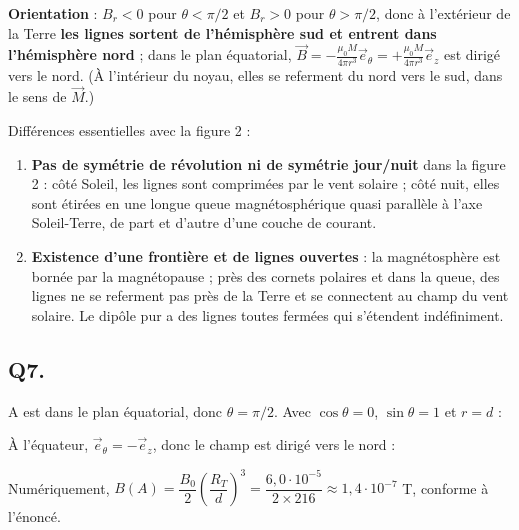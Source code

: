 \documentclass[11pt,a4paper]{article}
\providecommand{\tightlist}{\setlength{\itemsep}{0pt}\setlength{\parskip}{0pt}}
\newcommand{\equationajustee}[1]{%
  \sbox{\boiteequation}{$\displaystyle #1$}%
  \ifdim\wd\boiteequation>\linewidth
    \[\resizebox{\linewidth}{!}{\usebox{\boiteequation}}\]%
  \else
    \[#1\]%
  \fi}
\begin{document}
\textbf{Orientation} : \(B_r<0\) pour \(\theta<\pi/2\) et \(B_r>0\) pour \(\theta>\pi/2\), donc à l'extérieur de la Terre \textbf{les lignes sortent de l'hémisphère sud et entrent dans l'hémisphère nord} ; dans le plan équatorial, \(\vec B=-\frac{\mu_0M}{4\pi r^3}\vec e_\theta=+\frac{\mu_0M}{4\pi r^3}\vec e_z\) est dirigé vers le nord. (À l'intérieur du noyau, elles se referment du nord vers le sud, dans le sens de \(\vec M\).)

Différences essentielles avec la figure 2 :

\begin{enumerate}
\def\labelenumi{\arabic{enumi}.}
\tightlist
\item
  \textbf{Pas de symétrie de révolution ni de symétrie jour/nuit} dans la figure 2 : côté Soleil, les lignes sont comprimées par le vent solaire ; côté nuit, elles sont étirées en une longue queue magnétosphérique quasi parallèle à l'axe Soleil-Terre, de part et d'autre d'une couche de courant.
\item
  \textbf{Existence d'une frontière et de lignes ouvertes} : la magnétosphère est bornée par la magnétopause ; près des cornets polaires et dans la queue, des lignes ne se referment pas près de la Terre et se connectent au champ du vent solaire. Le dipôle pur a des lignes toutes fermées qui s'étendent indéfiniment.
\end{enumerate}

\hypertarget{q7.}{%
\subsection{Q7.}\label{q7.}}

A est dans le plan équatorial, donc \(\boxed{\theta=\pi/2}\). Avec \(\cos\theta=0\), \(\sin\theta=1\) et \(r=d\) :

\equationajustee{\boxed{\begin{aligned}
B_r&=0\\
B_\theta&=-\frac{\mu_0M}{4\pi d^3}\\
B_\varphi&=0
\end{aligned}}}

À l'équateur, \(\vec e_\theta=-\vec e_z\), donc le champ est dirigé vers le nord :

\equationajustee{\vec B(A)=\frac{\mu_0M}{4\pi d^3}\,\vec e_z.}

Numériquement, \(B(A)=\dfrac{B_0}{2}\left(\dfrac{R_T}{d}\right)^3=\dfrac{6{,}0\cdot10^{-5}}{2\times216}\approx1{,}4\cdot10^{-7}\) T, conforme à l'énoncé.
\end{document}

